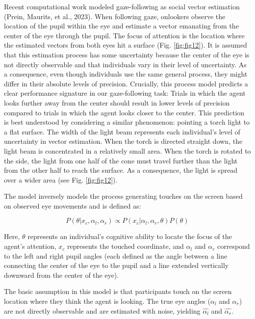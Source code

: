 \documentclass[
  man,floatsintext]{apa6}
\begin{document}
Recent computational work modeled gaze-following as social vector estimation (Prein, Maurits, et al., 2023). When following gaze, onlookers observe the location of the pupil within the eye and estimate a vector emanating from the center of the eye through the pupil. The focus of attention is the location where the estimated vectors from both eyes hit a surface (Fig. \ref{fig:fig12}). It is assumed that this estimation process has some uncertainty because the center of the eye is not directly observable and that individuals vary in their level of uncertainty. As a consequence, even though individuals use the same general process, they might differ in their absolute levels of precision. Crucially, this process model predicts a clear performance signature in our gaze-following task: Trials in which the agent looks further away from the center should result in lower levels of precision compared to trials in which the agent looks closer to the center. This prediction is best understood by considering a similar phenomenon: pointing a torch light to a flat surface. The width of the light beam represents each individual's level of uncertainty in vector estimation. When the torch is directed straight down, the light beam is concentrated in a relatively small area. When the torch is rotated to the side, the light from one half of the cone must travel further than the light from the other half to reach the surface. As a consequence, the light is spread over a wider area (see Fig. \ref{fig:fig12}).

The model inversely models the process generating touches on the screen based on observed eye movements and is defined as:

\begin{equation}
    P(\theta | x_c, \alpha_l, \alpha_r) \propto P(x_c | \alpha_l, \alpha_r, \theta)P(\theta)
\end{equation}

Here, \(\theta\) represents an individual's cognitive ability to locate the focus of the agent's attention, \(x_c\) represents the touched coordinate, and \(\alpha_l\) and \(\alpha_r\) correspond to the left and right pupil angles (each defined as the angle between a line connecting the center of the eye to the pupil and a line extended vertically downward from the center of the eye).

The basic assumption in this model is that participants touch on the screen location where they think the agent is looking. The true eye angles (\(\alpha_l\) and \(\alpha_r\)) are not directly observable and are estimated with noise, yielding \(\hat{\alpha_l}\) and \(\hat{\alpha_r}\).
\end{document}
